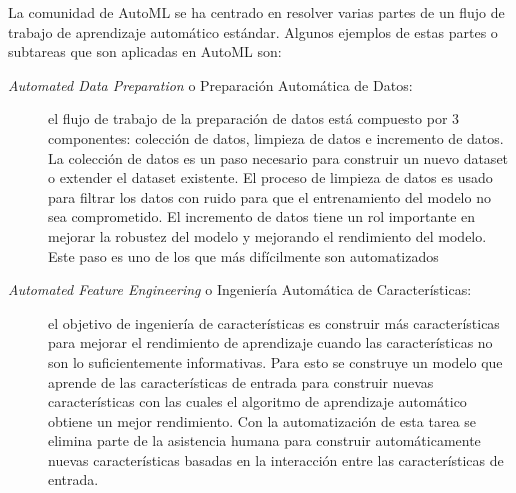 La comunidad de AutoML se ha centrado en resolver varias partes de un flujo de trabajo de aprendizaje automático estándar. Algunos ejemplos de estas partes o subtareas que son aplicadas en AutoML son:

\begin{description}
	\item[\textit{Automated Data Preparation} o Preparación Automática de Datos:] el flujo de trabajo de la preparación de datos está compuesto por 3 componentes: colección de datos, limpieza de datos e incremento de datos. La colección de datos es un paso necesario para construir un nuevo dataset o extender el dataset existente. El proceso de limpieza de datos es usado para filtrar los datos con ruido para que el entrenamiento del modelo no sea comprometido. El incremento de datos tiene un rol importante en mejorar la robustez del modelo y mejorando el rendimiento del modelo. Este paso es uno de los que más difícilmente son automatizados
	
	\item[\textit{Automated Feature Engineering} o Ingeniería Automática de Características:] el objetivo de ingeniería de características es construir más características para mejorar el rendimiento de aprendizaje cuando las características no son lo suficientemente informativas. Para esto se construye un modelo que aprende de las características de entrada para construir nuevas características con las cuales el algoritmo de aprendizaje automático obtiene un mejor rendimiento. Con la automatización de esta tarea se elimina parte de la asistencia humana para construir automáticamente nuevas características basadas en la interacción entre las características de entrada.
	

	

\end{description}
